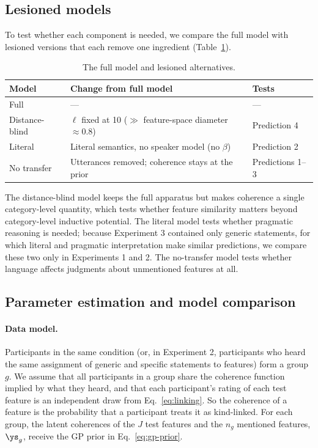 \subsection{Lesioned models}
\label{sec:lesions}

To test whether each component is needed, we compare the full model with
lesioned versions that each remove one ingredient (Table~\ref{tab:lesions}).

\begin{table}[ht]
\centering
\caption{The full model and lesioned alternatives.}
\label{tab:lesions}
\begin{tabular}{lll}
\toprule
Model & Change from full model & Tests \\
\midrule
Full & --- & --- \\
Distance-blind & $\ell$ fixed at 10 ($\gg$ feature-space diameter $\approx 0.8$) & Prediction 4 \\
Literal & Literal semantics, no speaker model (no $\beta$) & Prediction 2 \\
No transfer & Utterances removed; coherence stays at the prior & Predictions 1--3 \\
\bottomrule
\end{tabular}
\end{table}

The distance-blind model keeps the full apparatus but makes coherence a single
category-level quantity, which tests whether feature similarity matters beyond
category-level inductive potential. The literal model tests whether pragmatic
reasoning is needed; because Experiment 3 contained only generic statements, for
which literal and pragmatic interpretation make similar predictions, we compare
these two only in Experiments 1 and 2. The no-transfer model tests whether
language affects judgments about unmentioned features at all.

\subsection{Parameter estimation and model comparison}
\label{sec:inference}

\paragraph{Data model.} Participants in the same condition (or, in Experiment 2,
participants who heard the same assignment of generic and specific statements to
features) form a group $g$. We assume that all participants in a group share
the coherence function implied by what they heard, and that each participant's
rating of each test feature is an independent draw from
Eq.~\ref{eq:linking}. So the coherence of a feature is the probability that a
participant treats it as kind-linked. For each group, the latent coherences of
the $J$ test features and the $n_g$ mentioned features, $\ys_g$, receive the GP
prior in Eq.~\ref{eq:gp-prior}.

